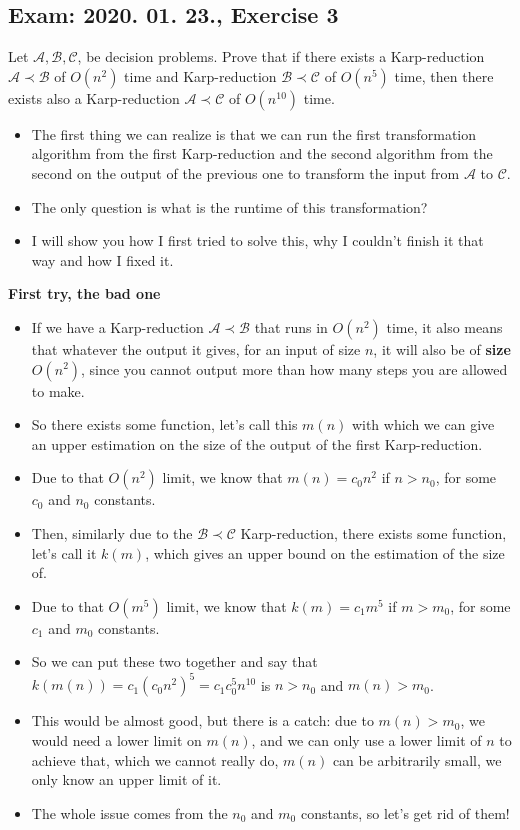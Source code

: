 \subsection {Exam: 2020. 01. 23., Exercise 3}


Let $\mathcal{A}, \mathcal{B}, \mathcal{C}$, be decision problems. Prove that if there exists a Karp-reduction $\mathcal{A} \prec \mathcal{B}$ of $O(n^2)$ time and Karp-reduction $\mathcal{B} \prec \mathcal{C}$ of $O(n^5)$ time, then there exists also a Karp-reduction $\mathcal{A}\prec{}\mathcal{C}$ of $O(n^10)$ time.


\begin{itemize}
    \item The first thing we can realize is that we can run the first transformation algorithm from the first Karp-reduction and the second algorithm from the second on the output of the previous one to transform the input from $\mathcal{A}$ to $\mathcal{C}$.
    \item The only question is what is the runtime of this transformation?
    \item I will show you how I first tried to solve this, why I couldn't finish it that way and how I fixed it.
\end{itemize}

\textbf{First try, the bad one}

\begin{itemize}
    \item If we have a Karp-reduction $\mathcal{A} \prec \mathcal{B}$ that runs in $O(n^2)$ time, it also means that whatever the output it gives, for an input of size $n$, it will also be of \textbf{size} $O(n^2)$, since you cannot output more than how many steps you are allowed to make.
    \item So there exists some function, let's call this $m(n)$ with which we can give an upper estimation on the size of the output of the first Karp-reduction.
    \item Due to that $O(n^2)$ limit, we know that $m(n) = c_0n^2$ if $n>n_0$, for some $c_0$ and $n_0$ constants.
    \item Then, similarly due to the $\mathcal{B} \prec \mathcal{C}$ Karp-reduction, there exists some function, let's call it $k(m)$, which gives an upper bound on the estimation of the size of.
    \item Due to that $O(m^5)$ limit, we know that $k(m) = c_1m^5$ if $m>m_0$, for some $c_1$ and $m_0$ constants.
    \item So we can put these two together and say that  $k(m(n)) = c_1(c_0n^2)^5 = c_1c_0^5n^10$ is $n > n_0$ and $m(n) > m_0$.
    \item This would be almost good, but there is a catch: due to $m(n) > m_0$, we would need a lower limit on $m(n)$, and we can only use a lower limit of $n$ to achieve that, which we cannot really do, $m(n)$ can be arbitrarily small, we only know an upper limit of it.
    \item The whole issue comes from the $n_0$ and $m_0$ constants, so let's get rid of them!
\end{itemize}

